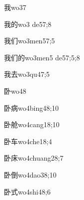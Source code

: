 \begin{verbete}{我}{wo3}{7}
\end{verbete}

\begin{verbete}{我的}{wo3 de5}{7;8}
\end{verbete}

\begin{verbete}{我们}{wo3men5}{7;5}
\end{verbete}

\begin{verbete}{我们的}{wo3men5 de5}{7;5;8}
\end{verbete}

\begin{verbete}{我去}{wo3qu4}{7;5}
\end{verbete}

\begin{verbete}{卧}{wo4}{8}
\end{verbete}

\begin{verbete}{卧病}{wo4bing4}{8;10}
\end{verbete}

\begin{verbete}{卧舱}{wo4cang1}{8;10}
\end{verbete}

\begin{verbete}{卧车}{wo4che1}{8;4}
\end{verbete}

\begin{verbete}{卧床}{wo4chuang2}{8;7}
\end{verbete}

\begin{verbete}{卧倒}{wo4dao3}{8;10}
\end{verbete}

\begin{verbete}{卧式}{wo4shi4}{8;6}
\end{verbete}

